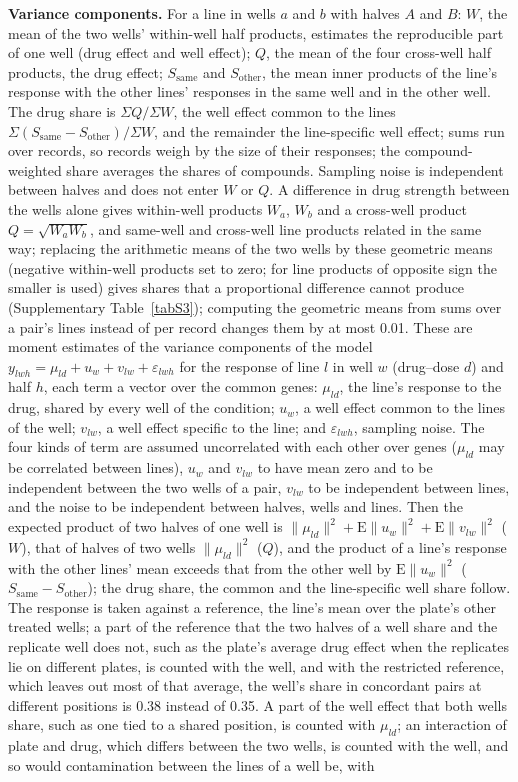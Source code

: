 \documentclass[pdflatex,sn-nature]{sn-jnl}
\begin{document}
\textbf{Variance components.} For a line in wells $a$ and $b$ with halves $A$ and $B$: $W$, the mean of the two wells' within-well half products, estimates the reproducible part of one well (drug effect and well effect); $Q$, the mean of the four cross-well half products, the drug effect; $S_\mathrm{same}$ and $S_\mathrm{other}$, the mean inner products of the line's response with the other lines' responses in the same well and in the other well. The drug share is $\Sigma Q/\Sigma W$, the well effect common to the lines $\Sigma(S_\mathrm{same}-S_\mathrm{other})/\Sigma W$, and the remainder the line-specific well effect; sums run over records, so records weigh by the size of their responses; the compound-weighted share averages the shares of compounds. Sampling noise is independent between halves and does not enter $W$ or $Q$. A difference in drug strength between the wells alone gives within-well products $W_a$, $W_b$ and a cross-well product $Q=\sqrt{W_aW_b}$, and same-well and cross-well line products related in the same way; replacing the arithmetic means of the two wells by these geometric means (negative within-well products set to zero; for line products of opposite sign the smaller is used) gives shares that a proportional difference cannot produce (Supplementary Table~\ref{tabS3}); computing the geometric means from sums over a pair's lines instead of per record changes them by at most 0.01. These are moment estimates of the variance components of the model $y_{lwh}=\mu_{ld}+u_w+v_{lw}+\varepsilon_{lwh}$ for the response of line $l$ in well $w$ (drug--dose $d$) and half $h$, each term a vector over the common genes: $\mu_{ld}$, the line's response to the drug, shared by every well of the condition; $u_w$, a well effect common to the lines of the well; $v_{lw}$, a well effect specific to the line; and $\varepsilon_{lwh}$, sampling noise. The four kinds of term are assumed uncorrelated with each other over genes ($\mu_{ld}$ may be correlated between lines), $u_w$ and $v_{lw}$ to have mean zero and to be independent between the two wells of a pair, $v_{lw}$ to be independent between lines, and the noise to be independent between halves, wells and lines. Then the expected product of two halves of one well is $\|\mu_{ld}\|^2+\mathrm{E}\|u_w\|^2+\mathrm{E}\|v_{lw}\|^2$ ($W$), that of halves of two wells $\|\mu_{ld}\|^2$ ($Q$), and the product of a line's response with the other lines' mean exceeds that from the other well by $\mathrm{E}\|u_w\|^2$ ($S_\mathrm{same}-S_\mathrm{other}$); the drug share, the common and the line-specific well share follow. The response is taken against a reference, the line's mean over the plate's other treated wells; a part of the reference that the two halves of a well share and the replicate well does not, such as the plate's average drug effect when the replicates lie on different plates, is counted with the well, and with the restricted reference, which leaves out most of that average, the well's share in concordant pairs at different positions is 0.38 instead of 0.35. A part of the well effect that both wells share, such as one tied to a shared position, is counted with $\mu_{ld}$; an interaction of plate and drug, which differs between the two wells, is counted with the well, and so would contamination between the lines of a well be, with 
\end{document}
